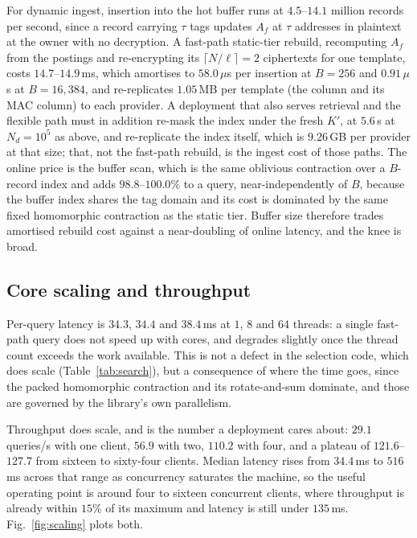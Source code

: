 \documentclass[a4paper,fleqn]{cas-sc}
\begin{document}
For dynamic ingest, insertion into the hot buffer runs at $4.5$--$14.1$
million records per second, since a record carrying $\tau$ tags updates $A_f$
at $\tau$ addresses in plaintext at the owner with no decryption. A fast-path
static-tier rebuild, recomputing $A_f$ from the postings and re-encrypting its
$\lceil N/\ell\rceil=2$ ciphertexts for one template, costs
$14.7$--$14.9$\,ms, which amortises to $58.0\,\mu$s per insertion at $B=256$
and $0.91\,\mu$s at $B=16{,}384$, and re-replicates $1.05$\,MB per template
(the column and its MAC column) to each provider. A deployment that also
serves retrieval and the flexible path must in addition re-mask the index
under the fresh $K'$, at $5.6$\,s at $N_d=10^5$ as above, and re-replicate the
index itself, which is $9.26$\,GB per provider at that size; that, not the
fast-path rebuild, is the ingest cost of those paths. The online price is the buffer scan, which is the
same oblivious contraction over a $B$-record index and adds
$98.8$--$100.0\%$ to a query, near-independently of $B$, because the buffer
index shares the tag domain and its cost is dominated by the same fixed
homomorphic contraction as the static tier. Buffer size therefore trades
amortised rebuild cost against a near-doubling of online latency, and the knee
is broad.

\subsection{Core scaling and throughput}
\label{sec:scaling}
Per-query latency is $34.3$, $34.4$ and $38.4$\,ms at $1$, $8$ and $64$
threads: a single fast-path query does not speed up with cores, and degrades
slightly once the thread count exceeds the work available. This is not a
defect in the selection code, which does scale (Table~\ref{tab:search}), but a
consequence of where the time goes, since the packed homomorphic contraction
and its rotate-and-sum dominate, and those are governed by the library's own
parallelism.

Throughput does scale, and is the number a deployment cares about: $29.1$
queries/s with one client, $56.9$ with two, $110.2$ with four, and a plateau
of $121.6$--$127.7$ from sixteen to sixty-four clients. Median latency rises
from $34.4$\,ms to $516$\,ms across that range as concurrency saturates the
machine, so the useful operating point is around four to sixteen concurrent
clients, where throughput is already within $15\%$ of its maximum and latency
is still under $135$\,ms. Fig.~\ref{fig:scaling} plots both.
\end{document}
